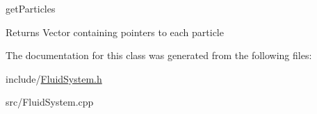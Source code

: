 get\+Particles 

\begin{DoxyReturn}{Returns}
Vector containing pointers to each particle 
\end{DoxyReturn}


The documentation for this class was generated from the following files\+:\begin{DoxyCompactItemize}
\item 
include/\hyperlink{FluidSystem_8h}{Fluid\+System.\+h}\item 
src/Fluid\+System.\+cpp\end{DoxyCompactItemize}
